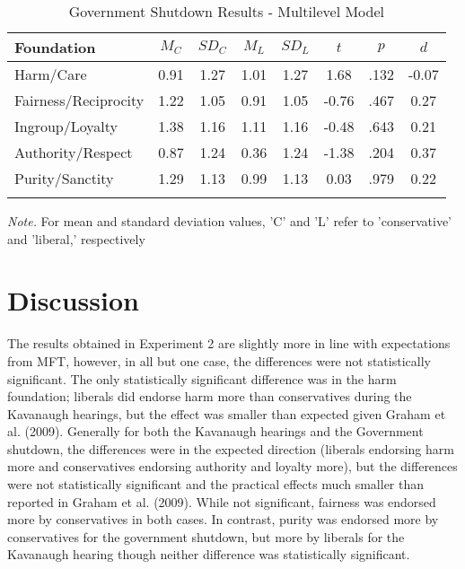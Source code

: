 \documentclass[
  english,
  man]{apa6}
\begin{document}
\begin{table}[tbp]

\begin{center}
\begin{threeparttable}

\caption{\label{tab:exp2-tablegs}Government Shutdown Results - Multilevel Model}

\footnotesize{

\begin{tabular}{lccccccc}
\toprule
Foundation & $M_C$ & $SD_C$ & $M_L$ & $SD_L$ & $t$ & $p$ & $d$\\
\midrule
Harm/Care & 0.91 & 1.27 & 1.01 & 1.27 & 1.68 & .132 & -0.07\\
Fairness/Reciprocity & 1.22 & 1.05 & 0.91 & 1.05 & -0.76 & .467 & 0.27\\
Ingroup/Loyalty & 1.38 & 1.16 & 1.11 & 1.16 & -0.48 & .643 & 0.21\\
Authority/Respect & 0.87 & 1.24 & 0.36 & 1.24 & -1.38 & .204 & 0.37\\
Purity/Sanctity & 1.29 & 1.13 & 0.99 & 1.13 & 0.03 & .979 & 0.22\\
\bottomrule
\addlinespace
\end{tabular}

}

\begin{tablenotes}[para]
\normalsize{\textit{Note.} For mean and standard deviation values, 'C' and 'L' refer to 'conservative' and 'liberal,' respectively}
\end{tablenotes}

\end{threeparttable}
\end{center}

\end{table}

\hypertarget{discussion-1}{%
\section{Discussion}\label{discussion-1}}

The results obtained in Experiment 2 are slightly more in line with expectations from MFT, however, in all but one case, the differences were not statistically significant. The only statistically significant difference was in the harm foundation; liberals did endorse harm more than conservatives during the Kavanaugh hearings, but the effect was smaller than expected given Graham et al. (2009). Generally for both the Kavanaugh hearings and the Government shutdown, the differences were in the expected direction (liberals endorsing harm more and conservatives endorsing authority and loyalty more), but the differences were not statistically significant and the practical effects much smaller than reported in Graham et al. (2009). While not significant, fairness was endorsed more by conservatives in both cases. In contrast, purity was endorsed more by conservatives for the government shutdown, but more by liberals for the Kavanaugh hearing though neither difference was statistically significant.
\end{document}
